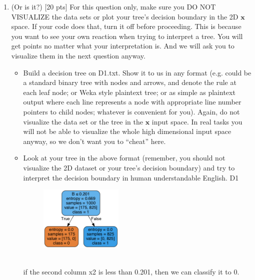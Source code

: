 \documentclass[a4paper]{article}
\theoremstyle{definition}
\def\x{\mathbf x}
\begin{document}
\begin{enumerate}
\begin{itemize}
\end{itemize}









\item (Or is it?)  [20 pts] For this question only, make sure you DO NOT VISUALIZE the data sets or plot your tree's decision boundary in the 2D $\x$ space.  If your code does that, turn it off before proceeding.  This is because you want to see your own reaction when trying to interpret a tree.  You will get points no matter what your interpretation is.
And we will ask you to visualize them in the next question anyway.
  \begin{itemize}
  \item Build a decision tree on D1.txt.  Show it to us in any format (e.g. could be a standard binary tree with nodes and arrows, and denote the rule at each leaf node; or Weka style plaintext tree; or as simple as plaintext output where each line represents a node with appropriate line number pointers to child nodes; whatever is convenient for you). Again, do not visualize the data set or the tree in the $\x$ input space.  In real tasks you will not be able to visualize the whole high dimensional input space anyway, so we don't want you to ``cheat'' here.
  \item Look at your tree in the above format (remember, you should not visualize the 2D dataset or your tree's decision boundary) and try to interpret the decision boundary in human understandable English. 
  D1
  \\
  
    \begin{figure}[H]
	       \centering
	        \includegraphics[width=0.4\textwidth]{51.png}
	       \captionsetup{labelformat=empty}
	     \caption{}
	       \label{fig:my_label}
	   \end{figure}
  \\
    if the second column x2 is less than 0.201, then we can classify it to 0.
   

\end{itemize}
\end{enumerate}
\end{document}
